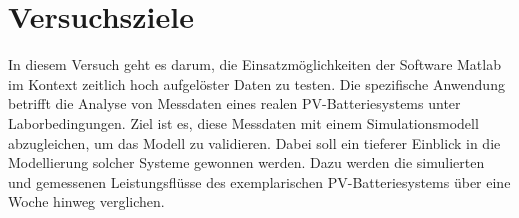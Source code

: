 \section{Versuchsziele}

In diesem Versuch geht es darum, die Einsatzmöglichkeiten der Software Matlab im Kontext zeitlich hoch aufgelöster Daten zu testen. Die spezifische Anwendung betrifft die Analyse von Messdaten eines realen PV-Batteriesystems unter Laborbedingungen.
 Ziel ist es, diese Messdaten mit einem Simulationsmodell abzugleichen, um das Modell zu validieren. Dabei soll ein tieferer Einblick in die Modellierung solcher Systeme gewonnen werden.
 Dazu werden die simulierten und gemessenen Leistungsflüsse des exemplarischen PV-Batteriesystems über eine Woche hinweg verglichen.
 
 
